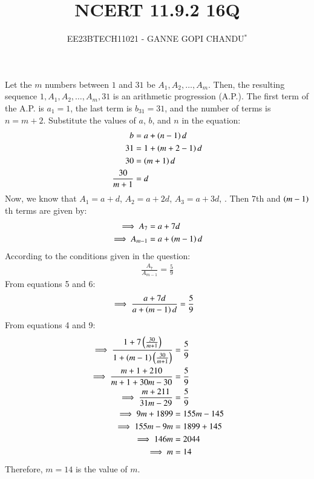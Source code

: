 \documentclass[journal,12pt,twocolumn]{IEEEtran}
\theoremstyle{remark}
\begin{document}

\vspace{3cm}
\title{NCERT 11.9.2 16Q}
\author{EE23BTECH11021 - GANNE GOPI CHANDU$^{*}$%
}
\maketitle
\newpage
\bigskip
\renewcommand{\thefigure}{\theenumi}
\renewcommand{\thetable}{\theenumi}

Let the $m$ numbers between $1$ and $31$ be $A_1, A_2, \ldots, A_{m}$. Then, the resulting sequence $1, A_1, A_2, \ldots, A_{m}, 31$ is an arithmetic progression (A.P.).
The first term of the A.P. is $a_1 = 1$, the last term is $b_{31} = 31$, and the number of terms is $n = m + 2$. 
Substitute the values of $a$, $b$, and $n$ in the equation:
\begin{align}
 b &= a + \left(n-1\right)d \\
31 &= 1 + \left(m + 2 - 1\right)d \\
30 &= \left(m + 1\right)d \\
\frac{30}{m + 1} &= d 
\end{align}
Now, we know that $A_1 = a + d$, $A_2 = a + 2d$, $A_3 = a + 3d$, . Then $7$th and $\left(m-1\right)$th terms are given by:
\begin{align}
\implies A_{7} &= a + 7d   \\ 
\implies A_{m-1} &= a + \left(m-1\right)d  
\end{align}
According to the conditions given in the question:
\begin{align}
\frac{A_{7}}{A_{m-1}} = \frac{5}{9} 
\end{align}
From equations 5 and 6:
\begin{align}
\implies \frac{a + 7d}{a + \left(m-1\right)d} &= \frac{5}{9} 
\end{align}
From equations 4 and 9:
\begin{align}
\implies \frac{1+7\left({\frac{30}{m+1}}\right)}{1+\left({m-1}\right)\left(\frac{30}{m+1}\right)} &= \frac{5}{9} \\
\implies \frac{m+1+210}{m+1+30m-30} &= \frac{5}{9}\\
\implies \frac{m+211}{31m-29} &= \frac{5}{9}\\
\implies 9m+1899 &=155m-145\\
\implies 155m-9m &=1899+145\\
\implies 146m &=2044\\
\implies m &=14
\end{align}
Therefore, $m = 14$ is the value of $m$.\\
\end{document}
